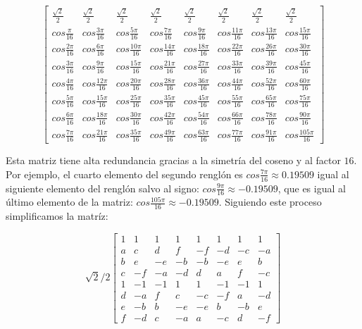 \begin{equation}
    \label{eq:dct-matrix}
    \begin{bmatrix}
        \frac{\sqrt{2}}{2} & \frac{\sqrt{2}}{2} & \frac{\sqrt{2}}{2} & \frac{\sqrt{2}}{2} & \frac{\sqrt{2}}{2} & \frac{\sqrt{2}}{2} & \frac{\sqrt{2}}{2} & \frac{\sqrt{2}}{2} \\
        cos\frac{\pi}{16} & cos\frac{3\pi}{16}& cos\frac{5\pi}{16}& cos\frac{7\pi}{16}& cos\frac{9\pi}{16}& cos\frac{11\pi}{16}& cos\frac{13\pi}{16}& cos\frac{15\pi}{16} \\
        cos\frac{2\pi}{16} & cos\frac{6\pi}{16}& cos\frac{10\pi}{16}& cos\frac{14\pi}{16}& cos\frac{18\pi}{16}& cos\frac{22\pi}{16}& cos\frac{26\pi}{16}& cos\frac{30\pi}{16} \\
        cos\frac{3\pi}{16} & cos\frac{9\pi}{16}& cos\frac{15\pi}{16}& cos\frac{21\pi}{16}& cos\frac{27\pi}{16}& cos\frac{33\pi}{16}& cos\frac{39\pi}{16}& cos\frac{45\pi}{16} \\
        cos\frac{4\pi}{16} & cos\frac{12\pi}{16}& cos\frac{20\pi}{16}& cos\frac{28\pi}{16}& cos\frac{36\pi}{16}& cos\frac{44\pi}{16}& cos\frac{52\pi}{16}& cos\frac{60\pi}{16} \\
        cos\frac{5\pi}{16} & cos\frac{15\pi}{16}& cos\frac{25\pi}{16}& cos\frac{35\pi}{16}& cos\frac{45\pi}{16}& cos\frac{55\pi}{16}& cos\frac{65\pi}{16}& cos\frac{75\pi}{16} \\
        cos\frac{6\pi}{16} & cos\frac{18\pi}{16}& cos\frac{30\pi}{16}& cos\frac{42\pi}{16}& cos\frac{54\pi}{16}& cos\frac{66\pi}{16}& cos\frac{78\pi}{16}& cos\frac{90\pi}{16} \\
        cos\frac{7\pi}{16} & cos\frac{21\pi}{16}& cos\frac{35\pi}{16}& cos\frac{49\pi}{16}& cos\frac{63\pi}{16}& cos\frac{77\pi}{16}& cos\frac{91\pi}{16}& cos\frac{105\pi}{16}
    \end{bmatrix}
\end{equation}

Esta matriz tiene alta redundancia gracias a la simetría del coseno y al factor $16$. Por ejemplo, el cuarto elemento del segundo renglón es $cos\frac{7\pi}{16} \approx 0.19509$ igual al siguiente elemento del renglón salvo al signo: $cos\frac{9\pi}{16} \approx -0.19509$, que es igual al último elemento de la matriz: $cos\frac{105\pi}{16} \approx -0.19509$. Siguiendo este proceso simplificamos la matríz:

\begin{equation}
    \label{eq:dct-matrix-simple}
    \sqrt{2}/2
    \begin{bmatrix}
        1 & 1 & 1 & 1 & 1 & 1 & 1 & 1  \\
        a & c & d & f & -f & -d & -c & -a \\
        b & e & -e & -b & -b & -e & e & b \\
        c & -f & -a & -d & d & a & f & -c \\
        1 & -1 & -1 & 1 & 1 & -1 & -1 & 1\\
        d & -a & f & c & -c & -f & a & -d \\
        e & -b & b & -e & -e & b & -b & e \\
        f & -d & c & -a & a & -c & d & -f
    \end{bmatrix}
\end{equation}

